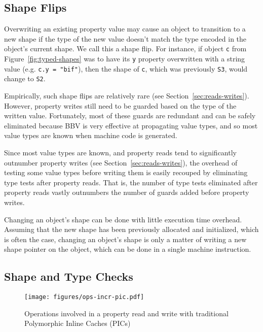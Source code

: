 \documentclass[preprint]{sigplanconf}
\begin{document}
\subsection{Shape Flips}

Overwriting an existing property value may cause an object to transition
to a new shape if the type of the new value doesn't match the type encoded in
the object's current shape. We call this a shape flip. For instance, if
object {\tt c} from Figure~\ref{fig:typed-shapes} was to have its {\tt y}
property overwritten with a string value (e.g. {\tt c.y = "bif"}), then the
shape of {\tt c}, which was previously {\tt S3}, would change to {\tt S2}.

Empirically, such shape flips are relatively rare (see
Section~\ref{sec:reads-writes}). However, property writes
still need to be guarded based on the type of the written value. Fortunately,
most of these guards are redundant and can be safely eliminated because BBV
is very effective at propagating value types, and so most value types are
known when machine code is generated.

Since most value types are known, and property reads tend to
significantly outnumber property writes (see Section~\ref{sec:reads-writes}),
the overhead of testing some value types before writing them is easily recouped
by eliminating type tests after property reads. That is, the number of type
tests eliminated after property reads vastly outnumbers the number of guards
added before property writes.

Changing an object's shape can be done with little execution time overhead.
Assuming that the new shape has been previously allocated and initialized,
which is often the case, changing an object's shape is only a matter of
writing a new shape pointer on the object, which can be done in a single
machine instruction.

\subsection{Shape and Type Checks}

\begin{figure}[tb]
\begin{center}
\texttt{[image: figures/ops-incr-pic.pdf]}
\end{center}
\caption{Operations involved in a property read and write with traditional Polymorphic Inline Caches (PICs)\label{fig:ops-incr-pic}}
\end{figure}
\end{document}
